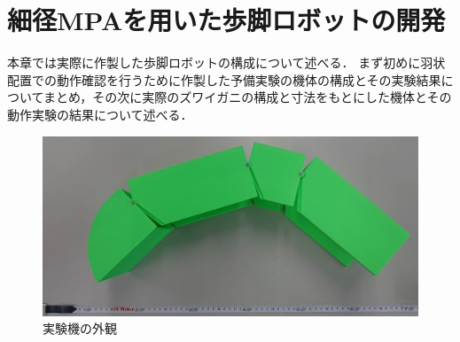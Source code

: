 \newpage
\section{細径MPAを用いた歩脚ロボットの開発}
本章では実際に作製した歩脚ロボットの構成について述べる．
まず初めに羽状配置での動作確認を行うために作製した予備実験の機体の構成とその実験結果についてまとめ，その次に実際のズワイガニの構成と寸法をもとにした機体とその動作実験の結果について述べる．
\begin{figure}[b]
  \centering
  \includegraphics[scale=0.21]{image/greenkitai.JPG}
  \caption{実験機の外観}
  \label{fig:pkitai}
\end{figure}
%
